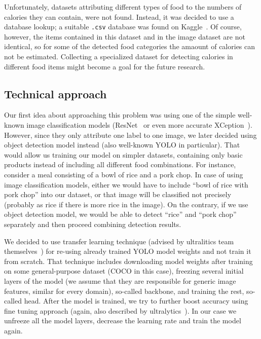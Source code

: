 \documentclass[10pt,twocolumn,letterpaper]{article}
\begin{document}
Unfortunately, datasets attributing different types of food to the numbers of calories they can contain, were not found.
Instead, it was decided to use a database lookup; a suitable \texttt{.csv} database was found on Kaggle~\cite{kaggle-calories}.
Of course, however, the items contained in this dataset and in the image dataset are not identical, so for some of the detected food categories the amaount of calories can not be estimated.
Collecting a specialized dataset for detecting calories in different food items might become a goal for the future research.

\subsection{Technical approach}

Our first idea about approaching this problem was using one of the simple well-known image classification models (ResNet~\cite{he2015deepresiduallearningimage} or even more accurate XCeption~\cite{chollet2017xceptiondeeplearningdepthwise}).
However, since they only attribute one label to one image, we later decided using object detection model instead (also well-known YOLO in particular).
That would allow us training our model on simpler datasets, containing only basic products instead of including all different food combinations.
For instance, consider a meal consisting of a bowl of rice and a pork chop.
In case of using image classification models, either we would have to include ``bowl of rice with pork chop'' into our dataset, or that image will be classified not precisely (probably as rice if there is more rice in the image).
On the contrary, if we use object detection model, we would be able to detect ``rice'' and ``pork chop'' separately and then proceed combining detection results.

We decided to use transfer learning technique (advised by ultralitics team themselves~\cite{ultralytics2024transferlearning}) for re-using already trained YOLO model weights and not train it from scratch.
That technique includes downloading model weights after training on some general-purpose dataset (COCO in this case), freezing several initial layers of the model (we assume that they are responsible for generic image features, similar for every domain), so-called backbone, and training the rest, so-called head.
After the model is trained, we try to further boost accuracy using fine tuning approach (again, also described by ultralytics~\cite{ultralytics2024finetuning}).
In our case we unfreeze all the model layers, decrease the learning rate and train the model again.
\end{document}
